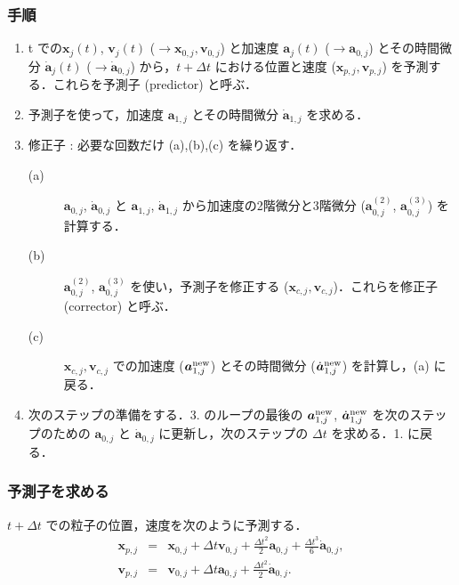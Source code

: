 \documentclass[11pt,a4paper,oneside,onecolumn]{jreport}
\begin{document}
\subsubsection{手順}
\begin{enumerate}
\item t での${\bm x}_j (t)$, ${\bm v}_j (t)$ ($\to {\bm x}_{0,j} , {\bm v}_{0,j}$) と加速度 ${\bm a}_j (t)$ ($\to {\bm a}_{0,j}$) とその時間微分 $\dot{{\bm a}}_j (t)$ ($\to \dot{{\bm a}}_{0,j}$) から，$t + \Delta t$ における位置と速度 (${\bm x}_{p,j} , {\bm v}_{p,j}$) を予測する．これらを予測子 (predictor) と呼ぶ．
\item 予測子を使って，加速度 ${\bm a}_{1,j}$ とその時間微分 $\dot{{\bm a}}_{1,j}$ を求める．
\item 修正子 : 必要な回数だけ (a),(b),(c) を繰り返す．
\begin{description}
\item[(a)] ${\bm a}_{0,j}$, $\dot{{\bm a}}_{0,j}$ と ${\bm a}_{1,j}$, $\dot{{\bm a}}_{1,j}$ から加速度の2階微分と3階微分 (${\bm a}_{0,j}^{(2)}$, ${\bm a}_{0,j}^{(3)}$) を計算する．
\item[(b)] ${\bm a}_{0,j}^{(2)}$, ${\bm a}_{0,j}^{(3)}$ を使い，予測子を修正する (${\bm x}_{c,j} , {\bm v}_{c,j}$)．これらを修正子 (corrector) と呼ぶ．
\item[(c)] ${\bm x}_{c,j} , {\bm v}_{c,j}$ での加速度 (${\bm a}_{1,j}^{{\rm new}}$) とその時間微分 ($\dot{{\bm a}}_{1,j}^{{\rm new}}$) を計算し，(a) に戻る．
\end{description}
\item 次のステップの準備をする．3. のループの最後の ${\bm a}_{1,j}^{{\rm new}}$, $\dot{{\bm a}}_{1,j}^{{\rm new}}$ を次のステップのための ${\bm a}_{0,j}$ と $\dot{{\bm a}}_{0,j}$ に更新し，次のステップの $\Delta t$ を求める．1. に戻る．
\end{enumerate}

\subsubsection{予測子を求める}
$t + \Delta t$ での粒子の位置，速度を次のように予測する．
\begin{eqnarray}
{\bm x}_{p,j} & = & {\bm x}_{0,j} + \Delta t {\bm v}_{0,j} + \frac{\Delta t ^2}{2} {\bm a}_{0,j} + \frac{\Delta t ^3}{6} \dot{{\bm a}}_{0,j}, \\
{\bm v}_{p,j} & = & {\bm v}_{0,j} + \Delta t {\bm a}_{0,j} + \frac{\Delta t ^2}{2} \dot{{\bm a}}_{0,j}. 
\end{eqnarray}
\end{document}

